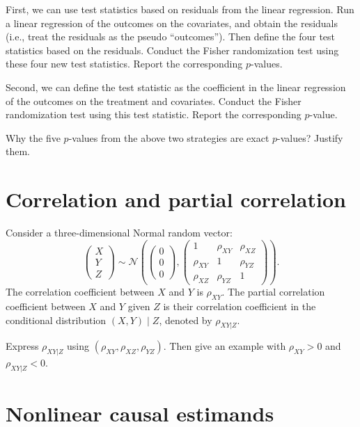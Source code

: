 \documentclass[11pt]{article}
\theoremstyle{definition}
\begin{document}
First, we can use test statistics based on residuals from the linear regression. Run a linear regression of the outcomes on the covariates, and obtain the residuals (i.e., treat the residuals as the pseudo ``outcomes''). Then define the four test statistics based on the residuals. Conduct the Fisher randomization test using these four new test statistics. Report the corresponding $p$-values.


Second, we can define the test statistic as the coefficient in the linear regression of the outcomes on the treatment and covariates. Conduct the Fisher randomization test using this test statistic. Report the corresponding $p$-value. 


Why the five $p$-values from the above two strategies are exact $p$-values? Justify them. 



\section{Correlation and partial correlation}

Consider a three-dimensional Normal random vector:
$$
\begin{pmatrix}
X\\
Y\\
Z
\end{pmatrix}
\sim 
\mathcal{N}
\left(
\begin{pmatrix}
0\\
0\\
0
\end{pmatrix},
\begin{pmatrix}
1 & \rho_{XY} &\rho_{XZ} \\
  \rho_{XY}  & 1 & \rho_{YZ} \\
  \rho_{XZ} &  \rho_{YZ} & 1
\end{pmatrix}
\right) . 
$$
The correlation coefficient between $X$ and $Y$ is $\rho_{XY}$. The partial correlation coefficient between $X$ and $Y$ given $Z$ is their correlation coefficient in the conditional distribution $(X,Y)\mid Z$, denoted by $\rho_{XY|Z}$.

Express $\rho_{XY|Z}$ using $(\rho_{XY}, \rho_{XZ}, \rho_{YZ}) $. Then give an example with $\rho_{XY} > 0$ and $\rho_{XY|Z} < 0$.






\section{Nonlinear causal estimands}
\end{document}
